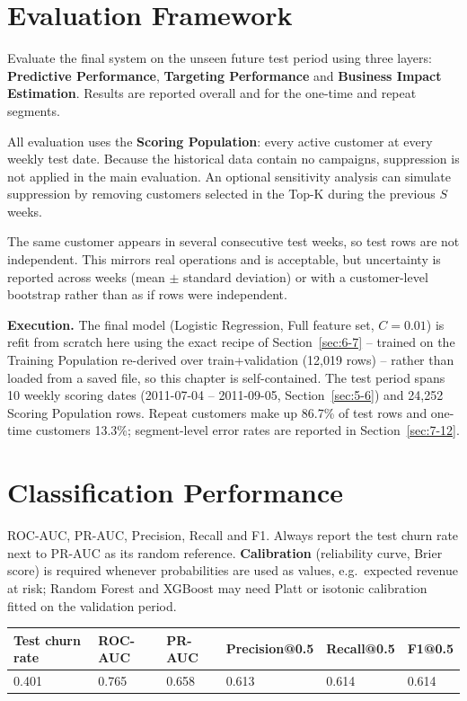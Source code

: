 \section{Evaluation Framework}
\label{sec:7-1}

Evaluate the final system on the unseen future test period using three layers: \textbf{Predictive Performance}, \textbf{Targeting Performance} and \textbf{Business Impact Estimation}. Results are reported overall and for the one-time and repeat segments.

All evaluation uses the \textbf{Scoring Population}: every active customer at every weekly test date. Because the historical data contain no campaigns, suppression is not applied in the main evaluation. An optional sensitivity analysis can simulate suppression by removing customers selected in the Top-K during the previous $S$ weeks.

The same customer appears in several consecutive test weeks, so test rows are not independent. This mirrors real operations and is acceptable, but uncertainty is reported across weeks (mean $\pm$ standard deviation) or with a customer-level bootstrap rather than as if rows were independent.

\textbf{Execution.} The final model (Logistic Regression, Full feature set, $C=0.01$) is refit from scratch here using the exact recipe of Section~\ref{sec:6-7} -- trained on the Training Population re-derived over train+validation (12,019 rows) -- rather than loaded from a saved file, so this chapter is self-contained. The test period spans 10 weekly scoring dates (2011-07-04 -- 2011-09-05, Section~\ref{sec:5-6}) and 24,252 Scoring Population rows. Repeat customers make up 86.7\% of test rows and one-time customers 13.3\%; segment-level error rates are reported in Section~\ref{sec:7-12}.

\section{Classification Performance}
\label{sec:7-2}

ROC-AUC, PR-AUC, Precision, Recall and F1. Always report the test churn rate next to PR-AUC as its random reference. \textbf{Calibration} (reliability curve, Brier score) is required whenever probabilities are used as values, e.g.\ expected revenue at risk; Random Forest and XGBoost may need Platt or isotonic calibration fitted on the validation period.

\begin{center}
\begin{tabular}{@{}p{2.6cm}p{1.8cm}p{1.8cm}p{2.4cm}p{1.8cm}p{1.8cm}@{}}
    \toprule
    Test churn rate & ROC-AUC & PR-AUC & Precision@0.5 & Recall@0.5 & F1@0.5 \\
    \midrule
    0.401 & 0.765 & 0.658 & 0.613 & 0.614 & 0.614 \\
    \bottomrule
\end{tabular}
\end{center}

